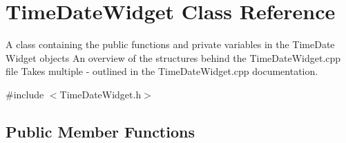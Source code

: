 \hypertarget{class_time_date_widget}{}\section{Time\+Date\+Widget Class Reference}
\label{class_time_date_widget}


A class containing the public functions and private variables in the Time\+Date Widget objects  An overview of the structures behind the Time\+Date\+Widget.\+cpp file  Takes multiple -\/ outlined in the Time\+Date\+Widget.\+cpp documentation.  




{\ttfamily \#include $<$Time\+Date\+Widget.\+h$>$}

\subsection*{Public Member Functions}
